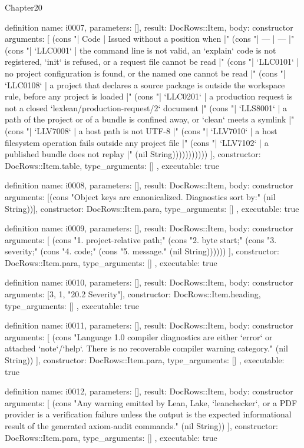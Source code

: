 \begin{lexlean}{Chapter20}
\begin{semanticmodule}
definition{
  name: i0007,
  parameters: [],
  result: DocRows::Item,
  body: constructor{
    arguments: [
      (cons "| Code | Issued without a position when |" (cons "| --- | --- |" (cons "| `LLC0001` | the command line is not valid, an `explain` code is not registered, `init` is refused, or a request file cannot be read |" (cons "| `LLC0101` | no project configuration is found, or the named one cannot be read |" (cons "| `LLC0108` | a project that declares a source package is outside the workspace rule, before any project is loaded |" (cons "| `LLC0201` | a production request is not a closed `lexlean/production-request/2` document |" (cons "| `LLS8001` | a path of the project or of a bundle is confined away, or `clean` meets a symlink |" (cons "| `LLV7008` | a host path is not UTF-8 |" (cons "| `LLV7010` | a host filesystem operation fails outside any project file |" (cons "| `LLV7102` | a published bundle does not replay |" (nil String)))))))))))
    ],
    constructor: DocRows::Item.table,
    type_arguments: []
  },
  executable: true
}

definition{
  name: i0008,
  parameters: [],
  result: DocRows::Item,
  body: constructor{
    arguments: [(cons "Object keys are canonicalized. Diagnostics sort by:" (nil String))],
    constructor: DocRows::Item.para,
    type_arguments: []
  },
  executable: true
}

definition{
  name: i0009,
  parameters: [],
  result: DocRows::Item,
  body: constructor{
    arguments: [
      (cons "1. project-relative path;" (cons "2. byte start;" (cons "3. severity;" (cons "4. code;" (cons "5. message." (nil String))))))
    ],
    constructor: DocRows::Item.para,
    type_arguments: []
  },
  executable: true
}

definition{
  name: i0010,
  parameters: [],
  result: DocRows::Item,
  body: constructor{
    arguments: [3, 1, "20.2 Severity"],
    constructor: DocRows::Item.heading,
    type_arguments: []
  },
  executable: true
}

definition{
  name: i0011,
  parameters: [],
  result: DocRows::Item,
  body: constructor{
    arguments: [
      (cons "Language 1.0 compiler diagnostics are either `error` or attached `note`/`help`. There is no recoverable compiler warning category." (nil String))
    ],
    constructor: DocRows::Item.para,
    type_arguments: []
  },
  executable: true
}

definition{
  name: i0012,
  parameters: [],
  result: DocRows::Item,
  body: constructor{
    arguments: [
      (cons "Any warning emitted by Lean, Lake, `leanchecker`, or a PDF provider is a verification failure unless the output is the expected informational result of the generated axiom-audit commands." (nil String))
    ],
    constructor: DocRows::Item.para,
    type_arguments: []
  },
  executable: true
}


\end{semanticmodule}
\end{lexlean}
